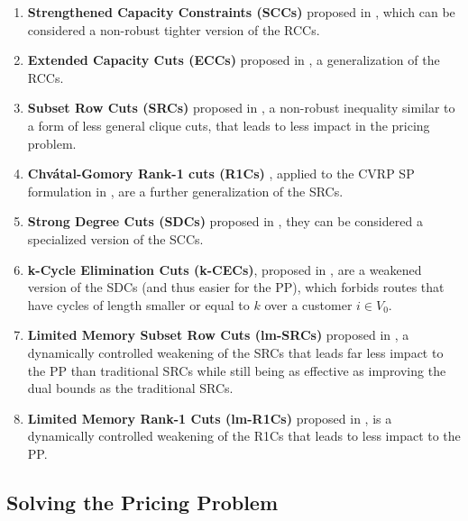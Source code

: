 \begin{enumerate}
    \setlength{\itemsep}{0pt}
    \setlength{\parskip}{0pt}

    \item \textbf{Strengthened Capacity Constraints (SCCs)} proposed in \textcite{baldacci2008},
        which can be considered a non-robust tighter version of the RCCs.
    \item \textbf{Extended Capacity Cuts (ECCs)} proposed in \textcite{pessoa2008, pessoa2009}, a
        generalization of the RCCs.
    \item \textbf{Subset Row Cuts (SRCs)} proposed in \textcite{jepsen2008a}, a non-robust
        inequality similar to a form of less general clique cuts,
        that leads to less impact in the pricing problem.
    \item \textbf{Chv\'atal-Gomory Rank-1 cuts (R1Cs)} \parencite{chvatal1973},
        applied to the CVRP SP formulation
        in \textcite{petersen2008}, are a further generalization of the SRCs.
    \item \textbf{Strong Degree Cuts (SDCs)} proposed in \textcite{contardo2011}, they can be considered
        a specialized version of the SCCs.
    \item \textbf{k-Cycle Elimination Cuts (k-CECs)}, proposed in \textcite{contardo2014},
        are a weakened version of the SDCs (and thus easier for the PP), which forbids
        routes that have cycles of length smaller or equal to $k$ over a customer $i \in V_0$.
    \item \textbf{Limited Memory Subset Row Cuts (lm-SRCs)} proposed in \textcite{pecin2017},
         a dynamically controlled weakening of the SRCs that leads far less impact to
         the PP than traditional
         SRCs while still being as effective as improving the dual bounds as the traditional SRCs.
    \item \textbf{Limited Memory Rank-1 Cuts (lm-R1Cs)} proposed in \textcite{pecin2017a},
        is a dynamically controlled weakening of the R1Cs that leads to less impact to the PP.
\end{enumerate}



\subsection{Solving the Pricing Problem}
\label{sec:intro-solving-the-pricing-problem}


